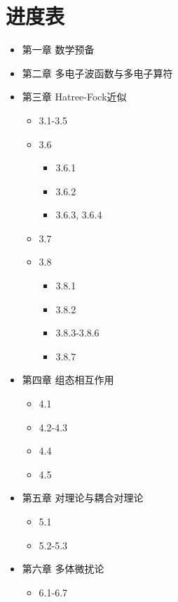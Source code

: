 \chapter*{进度表}
\begin{itemize}
    \item[\Square] 第一章 数学预备
    \item[\CheckedBox] 第二章 多电子波函数与多电子算符
    \item[\DSquare] 第三章 Hatree-Fock近似 \begin{itemize}
        \item[\CheckedBox] 3.1-3.5
        \item[\DSquare] 3.6 \begin{itemize}
            \item[\DSquare] 3.6.1 
            \item[\DSquare] 3.6.2
            \item[\Square] 3.6.3, 3.6.4
        \end{itemize}
        \item[\Square] 3.7
        \item[\DSquare] 3.8 \begin{itemize}
            \item[\CheckedBox] 3.8.1
            \item[\DSquare] 3.8.2
            \item[\Square] 3.8.3-3.8.6
            \item[\DSquare] 3.8.7
        \end{itemize}
    \end{itemize}
    \item[\DSquare] 第四章 组态相互作用 \begin{itemize}
        \item[\DSquare] 4.1
        \item[\Square] 4.2-4.3
        \item[\CheckedBox] 4.4
        \item[\DSquare] 4.5
    \end{itemize}
    \item[\DSquare] 第五章 对理论与耦合对理论 \begin{itemize}
        \item[\DSquare] 5.1
        \item[\Square] 5.2-5.3
    \end{itemize}
    \item[\DSquare] 第六章 多体微扰论 \begin{itemize}
        \item[\CheckedBox] 6.1-6.7

\end{itemize}
\end{itemize}
